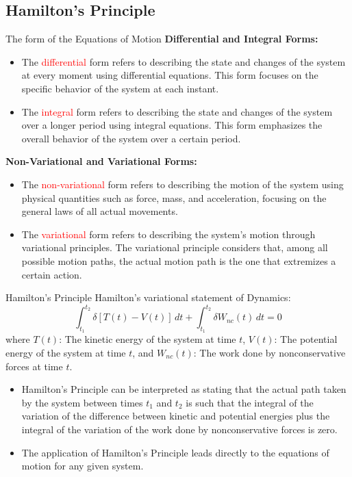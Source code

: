 \documentclass{beamer}
\begin{document}
\subsection{Hamilton's Principle}

\begin{frame}{The form of the Equations of Motion}
  \textbf{Differential and Integral Forms:}
  
  \begin{itemize}
    \item The \textcolor{red}{differential} form refers to describing the state and changes of the system at every moment using differential equations. This form focuses on the specific behavior of the system at each instant.
    \item The \textcolor{red}{integral} form refers to describing the state and changes of the system over a longer period using integral equations. This form emphasizes the overall behavior of the system over a certain period.
  \end{itemize}
  
  \textbf{Non-Variational and Variational Forms:}
  \begin{itemize}
    \item The \textcolor{red}{non-variational} form refers to describing the motion of the system using physical quantities such as force, mass, and acceleration, focusing on the general laws of all actual movements.
    \item The \textcolor{red}{variational} form refers to describing the system's motion through variational principles. 
    The variational principle considers that, among all possible motion paths, the actual motion path is the one that extremizes a certain action.
  \end{itemize}
  \end{frame}



  \begin{frame}{Hamilton's Principle}
Hamilton's variational statement of Dynamics:
\[
\int_{t_1}^{t_2} \delta [T(t) - V(t)] \, dt + \int_{t_1}^{t_2} \delta W_{nc}(t) \, dt = 0
\]
where \(T(t)\): The kinetic energy of the system at time \(t\), \(V(t)\): The potential energy of the system at time \(t\), and \(W_{nc}(t)\): The work done by nonconservative forces at time \(t\).

\begin{itemize}
  \item Hamilton's Principle can be interpreted as stating that the actual path taken by the system between times \(t_1\) and \(t_2\) 
  is such that the integral of the variation of the difference between kinetic and potential energies plus the integral of the variation of 
  the work done by nonconservative forces is zero. 
  \item The application of Hamilton's Principle leads directly to the equations of motion for any given system.
\end{itemize}
\end{frame}
\end{document}

